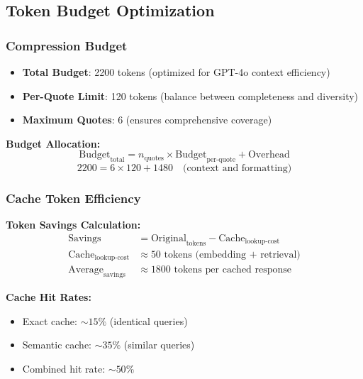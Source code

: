 \documentclass[11pt,a4paper]{article}
\begin{document}
\subsection{Token Budget Optimization}

\subsubsection{Compression Budget}
\begin{itemize}
    \item \textbf{Total Budget}: 2200 tokens (optimized for GPT-4o context efficiency)
    \item \textbf{Per-Quote Limit}: 120 tokens (balance between completeness and diversity)
    \item \textbf{Maximum Quotes}: 6 (ensures comprehensive coverage)
\end{itemize}

\textbf{Budget Allocation:}
\begin{equation}
\text{Budget}_{\text{total}} = n_{\text{quotes}} \times \text{Budget}_{\text{per-quote}} + \text{Overhead}
\end{equation}
\begin{equation}
2200 = 6 \times 120 + 1480 \quad \text{(context and formatting)}
\end{equation}

\subsubsection{Cache Token Efficiency}

\textbf{Token Savings Calculation:}
\begin{align}
\text{Savings} &= \text{Original}_{\text{tokens}} - \text{Cache}_{\text{lookup-cost}}\\
\text{Cache}_{\text{lookup-cost}} &\approx 50 \text{ tokens (embedding + retrieval)}\\
\text{Average}_{\text{savings}} &\approx 1800 \text{ tokens per cached response}
\end{align}

\textbf{Cache Hit Rates:}
\begin{itemize}
    \item Exact cache: $\sim15\%$ (identical queries)
    \item Semantic cache: $\sim35\%$ (similar queries)
    \item Combined hit rate: $\sim50\%$
\end{itemize}
\end{document}
